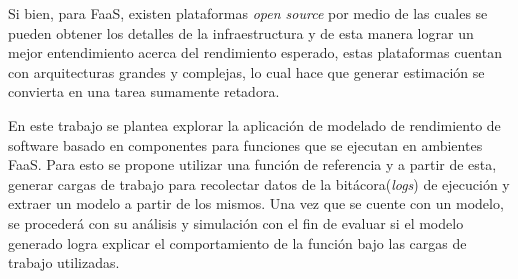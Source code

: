 Si bien, para FaaS, existen plataformas \textit{open source} por medio de las cuales se pueden obtener los detalles de la infraestructura y de esta manera lograr un mejor entendimiento acerca del rendimiento esperado, estas plataformas cuentan con arquitecturas grandes y complejas, lo cual hace que generar estimación se convierta en una tarea sumamente retadora.

En este trabajo se plantea explorar la aplicación de modelado de rendimiento de software basado en componentes para funciones que se ejecutan en ambientes FaaS. Para esto se propone utilizar una función de referencia y a partir de esta, generar cargas de trabajo para recolectar datos de la bitácora(\textit{logs}) de ejecución y extraer un modelo a partir de los mismos. Una vez que se cuente con un modelo, se procederá con su análisis y simulación con el fin de evaluar si el modelo generado logra explicar el comportamiento de la función bajo las cargas de trabajo utilizadas.

